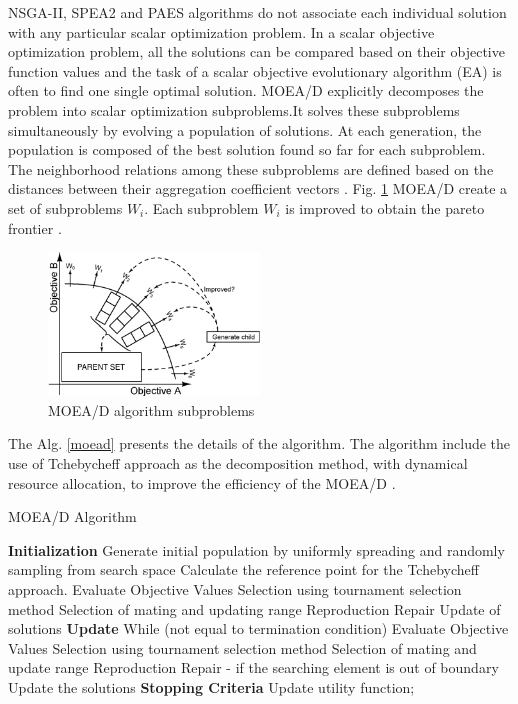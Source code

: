 \documentclass[espaco=umemeio,chapter=TITLE,twoside,openright]{abnt}
\begin{document}
NSGA-II, SPEA2 and PAES algorithms  do not associate each individual solution with
any particular scalar optimization problem. In a scalar objective optimization problem, all the solutions can be compared based
on their objective function values and the task of a scalar objective evolutionary algorithm (EA) is often to find one single
optimal solution. MOEA/D explicitly decomposes the problem into scalar optimization subproblems.It solves these subproblems simultaneously by evolving
a population of solutions. At each generation, the population is
composed of the best solution found so far for each subproblem. The neighborhood relations among these subproblems are defined based on the distances between their aggregation coefficient vectors \cite{Zhang2007} \cite{McConaghy2011}. Fig. \ref{fig:moead} MOEA/D create a set of subproblems $W_{i}$. Each subproblem $W_{i}$ is improved to obtain the pareto frontier \cite{McConaghy2011}. 


\begin{figure}[h]
\centering
\includegraphics[width=0.5\textwidth]{./images/moead.png}
\caption{MOEA/D algorithm subproblems \cite{McConaghy2011}}
\label{fig:moead}
\end{figure}

The Alg. \ref{moead} presents the details of the algorithm. The algorithm  include the
use of Tchebycheff approach as the decomposition method, with dynamical resource allocation, to improve the efficiency of the MOEA/D \cite{Yuen2009}. 

\begin{algorithm}[h]
  \caption{MOEA/D Algorithm}
  \label{moead}
  \begin{algorithmic}[1]
    \State \textbf{Initialization}
    \State Generate initial population by uniformly spreading and randomly sampling from search space
    \State Calculate the reference point for the Tchebycheff approach.
   \State Evaluate Objective Values 
   \State Selection using tournament selection method 
   \State Selection of mating and updating range
   \State Reproduction
   \State Repair
   \State Update of solutions 
   \State \textbf{Update}
   \State While (not equal to termination condition)
  \State Evaluate Objective Values
  \State Selection using tournament selection method
  \State Selection of mating and update range
  \State Reproduction
  \State Repair - if the searching element is out of boundary
  \State Update the solutions 
  \State \textbf{Stopping Criteria}
  \State Update utility function;
  \EndIf    
  \end{algorithmic}
\end{algorithm}
\end{document}
